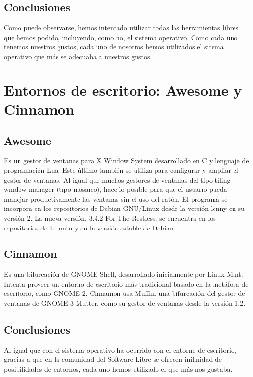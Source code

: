 \documentclass[12pt,a4paper]{report}
\begin{document}
\subsection{Conclusiones}

Como puede observarse, hemos intentado utilizar todas las herramientas libres
que hemos podido, incluyendo, como no, el sistema operativo. Como cada uno
tenemos nuestros gustos, cada uno de nosotros hemos utilizados el sitema
operativo que más se adecuaba a nuestros gustos. 


\section{Entornos de escritorio: Awesome y Cinnamon}

\subsection{Awesome}

Es un gestor de ventanas para X Window System desarrollado en C y lenguaje de
programación Lua. Este último también se utiliza para configurar y ampliar el
gestor de ventanas. Al igual que muchos gestores de ventanas del tipo tiling
window manager (tipo mosaico), hace lo posible para que el usuario pueda manejar
productivamente las ventanas sin el uso del ratón.  El programa se incorpora en
los repositorios de Debian GNU/Linux desde la versión lenny en su versión 2. La
nueva versión, 3.4.2 For The Restless, se encuentra en los repositorios de
Ubuntu y en la versión estable de Debian.

\subsection{Cinnamon}

Es una bifurcación de GNOME Shell, desarrollado inicialmente por Linux Mint.
Intenta proveer un entorno de escritorio más tradicional basado en la metáfora
de escritorio, como GNOME 2. Cinnamon usa Muffin, una bifurcación del gestor de
ventanas de GNOME 3 Mutter, como su gestor de ventanas desde la versión 1.2.

\subsection{Conclusiones}

Al igual que con el sistema operativo ha ocurrido con el entorno de escritorio,
gracias a que en la comunidad del Software Libre se ofrecen inifinidad de
posibilidades de entornos, cada uno hemos utilizado el que más nos gustaba.
\end{document}
